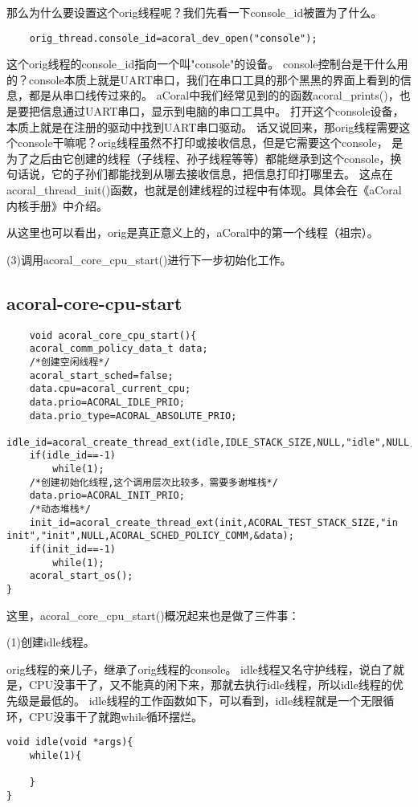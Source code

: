 那么为什么要设置这个orig线程呢？我们先看一下console\_id被置为了什么。
\begin{lstlisting}
	orig_thread.console_id=acoral_dev_open("console");
\end{lstlisting}

这个orig线程的console\_id指向一个叫"console"的设备。
console控制台是干什么用的？console本质上就是UART串口，我们在串口工具的那个黑黑的界面上看到的信息，都是从串口线传过来的。
aCoral中我们经常见到的的函数acoral\_prints()，也是要把信息通过UART串口，显示到电脑的串口工具中。
打开这个console设备，本质上就是在注册的驱动中找到UART串口驱动。
话又说回来，那orig线程需要这个console干嘛呢？orig线程虽然不打印或接收信息，但是它需要这个console，
是为了之后由它创建的线程（子线程、孙子线程等等）都能继承到这个console，换句话说，它的子孙们都能找到从哪去接收信息，把信息打印打哪里去。
这点在acoral\_thread\_init()函数，也就是创建线程的过程中有体现。具体会在《aCoral内核手册》中介绍。

从这里也可以看出，orig是真正意义上的，aCoral中的第一个线程（祖宗）。


(3)调用acoral\_core\_cpu\_start()进行下一步初始化工作。

\subsection{acoral-core-cpu-start}
\begin{lstlisting}
	void acoral_core_cpu_start(){
	acoral_comm_policy_data_t data;
	/*创建空闲线程*/
	acoral_start_sched=false;
	data.cpu=acoral_current_cpu;
	data.prio=ACORAL_IDLE_PRIO;
	data.prio_type=ACORAL_ABSOLUTE_PRIO;
	idle_id=acoral_create_thread_ext(idle,IDLE_STACK_SIZE,NULL,"idle",NULL,ACORAL_SCHED_POLICY_COMM,&data);
	if(idle_id==-1)
		while(1);
	/*创建初始化线程,这个调用层次比较多，需要多谢堆栈*/
	data.prio=ACORAL_INIT_PRIO;
	/*动态堆栈*/
	init_id=acoral_create_thread_ext(init,ACORAL_TEST_STACK_SIZE,"in init","init",NULL,ACORAL_SCHED_POLICY_COMM,&data);
	if(init_id==-1)
		while(1);
	acoral_start_os();
}
\end{lstlisting}

这里，acoral\_core\_cpu\_start()概况起来也是做了三件事：

(1)创建idle线程。

orig线程的亲儿子，继承了orig线程的console。
idle线程又名守护线程，说白了就是，CPU没事干了，又不能真的闲下来，那就去执行idle线程，所以idle线程的优先级是最低的。
idle线程的工作函数如下，可以看到，idle线程就是一个无限循环，CPU没事干了就跑while循环摆烂。
\begin{lstlisting}
void idle(void *args){
	while(1){

	}
}
\end{lstlisting}

